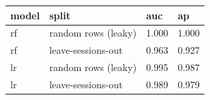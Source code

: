 \begin{tabular}{llll}
\toprule
model & split & auc & ap \\
\midrule
rf & random rows (leaky) & 1.000 & 1.000 \\
rf & leave-sessions-out & 0.963 & 0.927 \\
lr & random rows (leaky) & 0.995 & 0.987 \\
lr & leave-sessions-out & 0.989 & 0.979 \\
\bottomrule
\end{tabular}
